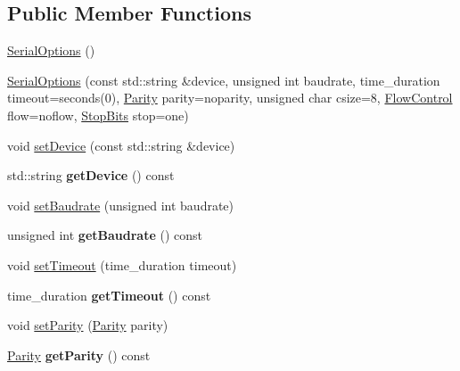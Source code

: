 \subsection*{Public Member Functions}
\begin{DoxyCompactItemize}
\item 
\hyperlink{class_serial_options_accb31280b6beef6b8a00a06639c938a3}{Serial\-Options} ()
\item 
\hyperlink{class_serial_options_aebce648c4c3ab68f09c0ad359023e169}{Serial\-Options} (const std\-::string \&device, unsigned int baudrate, time\-\_\-duration timeout=seconds(0), \hyperlink{class_serial_options_af3761748c70f9d31c7c9f9368e15bf24}{Parity} parity=noparity, unsigned char csize=8, \hyperlink{class_serial_options_a747496555e093069ff4e943f38954c0f}{Flow\-Control} flow=noflow, \hyperlink{class_serial_options_acdb2c9f835d6efff77acdac0ca1dd0ea}{Stop\-Bits} stop=one)
\item 
void \hyperlink{class_serial_options_ab11afbd71f690893b8237d7a5c492ffd}{set\-Device} (const std\-::string \&device)
\item 
\hypertarget{class_serial_options_a831433118475b1626ed7c8b5bf086889}{std\-::string {\bfseries get\-Device} () const }\label{class_serial_options_a831433118475b1626ed7c8b5bf086889}

\item 
void \hyperlink{class_serial_options_a9fee4da9c869a12030c5acec04835246}{set\-Baudrate} (unsigned int baudrate)
\item 
\hypertarget{class_serial_options_ae30984317f86df2896482faa6eebabe9}{unsigned int {\bfseries get\-Baudrate} () const }\label{class_serial_options_ae30984317f86df2896482faa6eebabe9}

\item 
void \hyperlink{class_serial_options_a6d63853701146cffd863ceaf130630b9}{set\-Timeout} (time\-\_\-duration timeout)
\item 
\hypertarget{class_serial_options_a13d22102b32ae8c14438205d6a1f531e}{time\-\_\-duration {\bfseries get\-Timeout} () const }\label{class_serial_options_a13d22102b32ae8c14438205d6a1f531e}

\item 
void \hyperlink{class_serial_options_af3200fca277999edb89d9ba4cee3eea9}{set\-Parity} (\hyperlink{class_serial_options_af3761748c70f9d31c7c9f9368e15bf24}{Parity} parity)
\item 
\hypertarget{class_serial_options_a0334f0968a1f0cfa81cdb1fad70074c9}{\hyperlink{class_serial_options_af3761748c70f9d31c7c9f9368e15bf24}{Parity} {\bfseries get\-Parity} () const }\label{class_serial_options_a0334f0968a1f0cfa81cdb1fad70074c9}


\end{DoxyCompactItemize}
